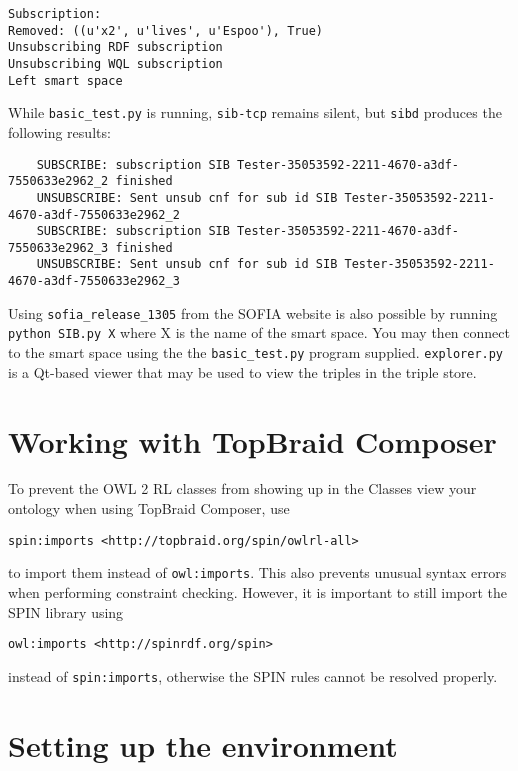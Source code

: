 \begin{verbatim}
Subscription:
Removed: ((u'x2', u'lives', u'Espoo'), True)
Unsubscribing RDF subscription
Unsubscribing WQL subscription
Left smart space
\end{verbatim}

While \texttt{basic\_test.py} is running, \texttt{sib-tcp} remains silent, but \texttt{sibd} produces the following results:

\begin{verbatim}
	SUBSCRIBE: subscription SIB Tester-35053592-2211-4670-a3df-7550633e2962_2 finished
	UNSUBSCRIBE: Sent unsub cnf for sub id SIB Tester-35053592-2211-4670-a3df-7550633e2962_2
	SUBSCRIBE: subscription SIB Tester-35053592-2211-4670-a3df-7550633e2962_3 finished
	UNSUBSCRIBE: Sent unsub cnf for sub id SIB Tester-35053592-2211-4670-a3df-7550633e2962_3
\end{verbatim}

Using \texttt{sofia\_release\_1305} from the SOFIA website is also possible by running \verb|python SIB.py X| where X is the name of the smart space. You may then connect to the smart space using the the \texttt{basic\_test.py} program supplied.
\texttt{explorer.py} is a Qt-based viewer that may be used to view the triples in the triple store.


\section{Working with TopBraid Composer}

To prevent the OWL 2 RL classes from showing up in the Classes view your ontology when using TopBraid Composer, use 

\begin{verbatim}
spin:imports <http://topbraid.org/spin/owlrl-all>
\end{verbatim}

to import them instead of \texttt{owl:imports}. This also prevents unusual syntax errors when performing constraint checking. However, it is important to still import the SPIN library using 

\begin{verbatim}
owl:imports <http://spinrdf.org/spin>
\end{verbatim}

instead of \texttt{spin:imports}, otherwise the SPIN rules cannot be resolved properly.


\section{Setting up the environment}

